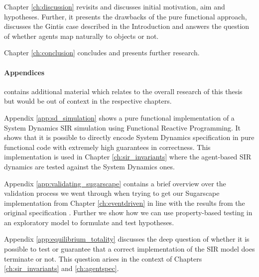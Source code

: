 
Chapter \ref{ch:discussion} revisits and discusses initial motivation, aim and hypotheses. Further, it presents the drawbacks of the pure functional approach, discusses the Gintis case described in the Introduction and answers the question of whether agents map naturally to objects or not.

\medskip

Chapter \ref{ch:conclusion} concludes and presents further research.

\paragraph{Appendices} contains additional material which relates to the overall research of this thesis but would be out of context in the respective chapters.
\medskip

Appendix \ref{app:sd_simulation} shows a pure functional implementation of a System Dynamics SIR simulation using Functional Reactive Programming. It shows that it is possible to directly encode System Dynamics specification in pure functional code with extremely high guarantees in correctness. This implementation is used in Chapter \ref{ch:sir_invariants} where the agent-based SIR dynamics are tested against the System Dynamics ones.

\medskip

Appendix \ref{app:validating_sugarscape} contains a brief overview over the validation process we went through when trying to get our Sugarscape implementation from Chapter \ref{ch:eventdriven} in line with the results from the original specification \cite{epstein_growing_1996}. Further we show how we can use property-based testing in an exploratory model to formulate and test hypotheses.

\medskip

Appendix \ref{app:equilibrium_totality} discusses the deep question of whether it is possible to test or guarantee that a correct implementation of the SIR model does terminate or not. This question arises in the context of Chapters \ref{ch:sir_invariants} and \ref{ch:agentspec}.